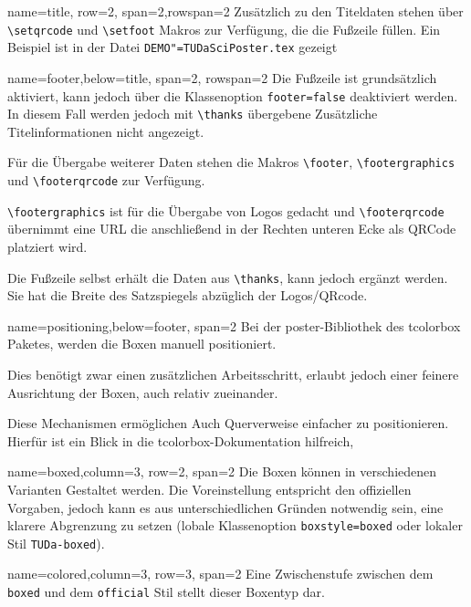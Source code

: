 \documentclass[
	accentcolor=9c,
	]{tudasciposter}
\newcommand{\tbs}{\textbackslash}
\let\code\texttt
\newcommand*{\macro}[1]{\code{\tbs#1}}
\let\file\texttt
\let\pck\textsf
\begin{document}
\begin{tcbposter}[
	poster={
		columns=4,
		rows=7,
		spacing=1cm,
	},]
\begin{posterboxenv}[title=Titelei]{name=title, row=2, span=2,rowspan=2}
	Zusätzlich zu den Titeldaten stehen über \macro{setqrcode} und \macro{setfoot} Makros zur Verfügung, die die Fußzeile füllen.
	Ein Beispiel ist in der Datei \file{DEMO"=TUDaSciPoster.tex} gezeigt
\end{posterboxenv}
	
\begin{posterboxenv}[title=Fußzeile]{name=footer,below=title, span=2, rowspan=2 }
	Die Fußzeile ist grundsätzlich aktiviert, kann jedoch über die Klassenoption \code{footer=false} deaktiviert werden. In diesem Fall werden jedoch mit \macro{thanks} übergebene Zusätzliche Titelinformationen nicht angezeigt.
	
	Für die Übergabe weiterer Daten stehen die Makros \macro{footer}, \macro{footergraphics} und \macro{footerqrcode} zur Verfügung.
	
	\macro{footergraphics} ist für die Übergabe von Logos gedacht und \macro{footerqrcode} übernimmt eine URL die anschließend in der Rechten unteren Ecke als QRCode platziert wird.
	
	Die Fußzeile selbst erhält die Daten aus \macro{thanks}, kann jedoch ergänzt werden. Sie hat die Breite des Satzspiegels abzüglich der Logos/QRcode.
\end{posterboxenv}
	

\begin{posterboxenv}[title=Platzierung der Boxen]{name=positioning,below=footer, span=2}
	Bei der \pck{poster}-Bibliothek des \pck{tcolorbox} Paketes, werden die Boxen manuell positioniert. 
	
	Dies benötigt zwar einen zusätzlichen Arbeitsschritt, erlaubt jedoch einer feinere Ausrichtung der Boxen, auch relativ zueinander. 
	
	Diese Mechanismen ermöglichen Auch Querverweise einfacher zu positionieren. Hierfür ist ein Blick in die \pck{tcolorbox}-Dokumentation hilfreich,
\end{posterboxenv}

\begin{posterboxenv}[title=Eine Box im Stil TUDa-boxed, TUDa-boxed]{name=boxed,column=3, row=2, span=2}
	Die Boxen können in verschiedenen Varianten Gestaltet werden. Die Voreinstellung entspricht den offiziellen Vorgaben, jedoch kann es aus unterschiedlichen Gründen notwendig sein, eine klarere Abgrenzung zu setzen (lobale Klassenoption \code{boxstyle=boxed} oder lokaler Stil \code{TUDa-boxed}).
\end{posterboxenv}


\begin{posterboxenv}[title=Eine Box im Stil TUDa-colored, TUDa-colored]{name=colored,column=3, row=3, span=2}
	Eine Zwischenstufe zwischen dem \code{boxed} und dem \code{official} Stil stellt dieser Boxentyp dar.
	

\end{posterboxenv}
\end{tcbposter}
\end{document}
